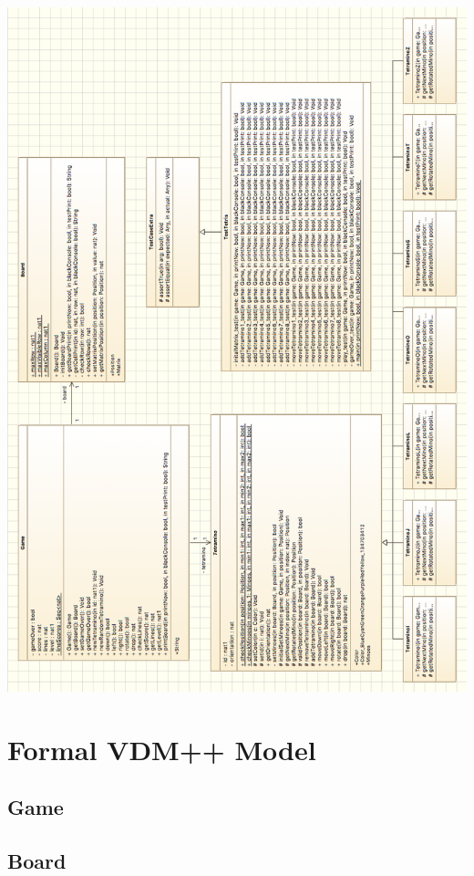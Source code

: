\documentclass[a4paper]{article}
\begin{document}
\begin{center}
	\includegraphics[scale=0.55]{resources/img/uml}
	\label{uml}
\end{center}
\restoregeometry

\section{Formal VDM++ Model}

\subsection{Game}

\subsection{Board}

\end{document}
